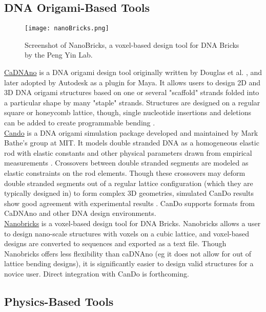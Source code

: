 {\subsection{DNA Origami-Based Tools}

\begin{figure}
  \texttt{[image: nanoBricks.png]}
  \caption{Screenshot of NanoBricks, a voxel-based design tool for DNA Bricks by the Peng Yin Lab.}
  \label{fig:nanoBricks}
\end{figure}

\href{http://cadnano.org/}{CaDNAno} is a DNA origami design tool originally written by Douglas et al. \cite{Douglas2009}, and later adopted by Autodesk as a plugin for Maya.  It allows users to design 2D and 3D DNA origami structures based on one or several "scaffold" strands folded into a particular shape by many "staple" strands.  Structures are designed on a regular square or honeycomb lattice, though, single nucleotide insertions and deletions can be added to create programmable bending \cite{Dietz2009} \cite{Kim2012}.\\

\href{http://cando-dna-origami.org/}{Cando} is a DNA origami simulation package developed and maintained by Mark Bathe's group at MIT.  It models double stranded DNA as a homogeneous elastic rod with elastic constants and other physical parameters drawn from empirical measurements \cite{Peters2014}.  Crossovers between double stranded segments are modeled as elastic constraints on the rod elements.  Though these crossovers may deform double stranded segments out of a regular lattice configuration (which they are typically designed in) to form complex 3D geometries, simulated CanDo results show good agreement with experimental results \cite{Kim2012a}.  CanDo supports formats from CaDNAno and other DNA design environments.
\\

\href{http://yin.hms.harvard.edu/bricks/try/}{Nanobricks} is a voxel-based design tool for DNA Bricks.  Nanobricks allows a user to design nano-scale structures with voxels on a cubic lattice, and voxel-based designs are converted to sequences and exported as a text file.  Though Nanobricks offers less flexibility than caDNAno (eg it does not allow for out of lattice bending designs), it is significantly easier to design valid structures for a novice user.  Direct integration with CanDo is forthcoming.
\\

\subsection{Physics-Based Tools}

}

